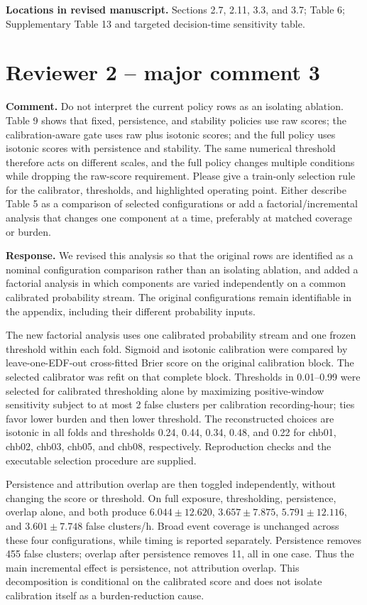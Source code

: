 \documentclass[11pt,a4paper]{article}
\begin{document}
\textbf{Locations in revised manuscript.} Sections 2.7, 2.11, 3.3, and 3.7; Table 6; Supplementary Table 13 and targeted decision-time sensitivity table.

\section*{Reviewer 2 -- major comment 3}

\textbf{Comment.} Do not interpret the current policy rows as an isolating ablation. Table 9 shows that fixed, persistence, and stability policies use raw scores; the calibration-aware gate uses raw plus isotonic scores; and the full policy uses isotonic scores with persistence and stability. The same numerical threshold therefore acts on different scales, and the full policy changes multiple conditions while dropping the raw-score requirement. Please give a train-only selection rule for the calibrator, thresholds, and highlighted operating point. Either describe Table 5 as a comparison of selected configurations or add a factorial/incremental analysis that changes one component at a time, preferably at matched coverage or burden.

\textbf{Response.} We revised this analysis so that the original rows are identified as a nominal configuration comparison rather than an isolating ablation, and added a factorial analysis in which components are varied independently on a common calibrated probability stream. The original configurations remain identifiable in the appendix, including their different probability inputs.

The new factorial analysis uses one calibrated probability stream and one frozen threshold within each fold. Sigmoid and isotonic calibration were compared by leave-one-EDF-out cross-fitted Brier score on the original calibration block. The selected calibrator was refit on that complete block. Thresholds in 0.01--0.99 were selected for calibrated thresholding alone by maximizing positive-window sensitivity subject to at most 2 false clusters per calibration recording-hour; ties favor lower burden and then lower threshold. The reconstructed choices are isotonic in all folds and thresholds 0.24, 0.44, 0.34, 0.48, and 0.22 for chb01, chb02, chb03, chb05, and chb08, respectively. Reproduction checks and the executable selection procedure are supplied.

Persistence and attribution overlap are then toggled independently, without changing the score or threshold. On full exposure, thresholding, persistence, overlap alone, and both produce $6.044\pm12.620$, $3.657\pm7.875$, $5.791\pm12.116$, and $3.601\pm7.748$ false clusters/h. Broad event coverage is unchanged across these four configurations, while timing is reported separately. Persistence removes 455 false clusters; overlap after persistence removes 11, all in one case. Thus the main incremental effect is persistence, not attribution overlap. This decomposition is conditional on the calibrated score and does not isolate calibration itself as a burden-reduction cause.
\end{document}
